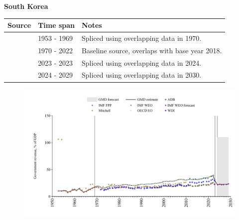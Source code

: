 \documentclass[12pt,a4paper,landscape]{article}
\begin{document}
\begin{adjustbox}{max totalsize={\paperwidth}{\paperheight},center}
\begin{minipage}[t][\textheight][t]{\textwidth}
\vspace*{0.5cm}
{}
\begin{center}
{\Large\bfseries South Korea}
\end{center}
\vspace{0.5cm}
\begin{table}[H]
\centering
\small
\begin{tabular}{|l|l|l|}
\hline
\textbf{Source} & \textbf{Time span} & \textbf{Notes} \\
\hline
\rowcolor{white}\cite{IMF_FPP}& 1953 - 1969 &Spliced using overlapping data in 1970.\\
\rowcolor{lightgray}\cite{OECD_EO}& 1970 - 2022 &Baseline source, overlaps with base year 2018.\\
\rowcolor{white}\cite{WDI}& 2023 - 2023 &Spliced using overlapping data in 2024.\\
\rowcolor{lightgray}\cite{IMF_WEO_forecast}& 2024 - 2029 &Spliced using overlapping data in 2030.\\
\hline
\end{tabular}
\end{table}
\begin{figure}[H]
\centering
\includegraphics[width=\textwidth,height=0.6\textheight,keepaspectratio]{graphs/KOR_govrev_GDP.pdf}
\end{figure}
\end{minipage}
\end{adjustbox}
\end{document}
